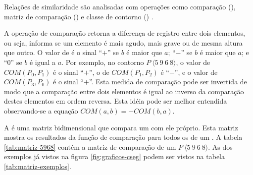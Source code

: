 Relações de similaridade \cite{marvin.ea87:relating} são analisadas
com operações como comparação (), matriz de comparação
() e classe de contorno () .

A operação de comparação  retorna a diferença de registro
entre dois elementos, ou seja, informa se um elemento é mais agudo,
mais grave ou de mesma altura que outro. O valor de  é o sinal
``$+$'' se $b$ é maior que $a$; ``$-$'' se $b$ é maior que $a$; e
``$0$'' se $b$ é igual a $a$. Por exemplo, no contorno
$P\:\langle5\:9\:6\:8\rangle$, o valor de $COM(P_0,P_1)$ é o sinal
``$+$'', o de $COM(P_1,P_2)$ é ``$-$'', e o valor de $COM(P_3,P_0)$ é
o sinal ``$+$''. Esta medida de comparação pode ser invertida de modo
que a comparação entre dois elementos é igual ao inverso da comparação
destes elementos em ordem reversa. Esta idéia pode ser melhor
entendida observando-se a equação $COM(a,b)=-COM(b,a)$.

A  é uma matriz bidimensional que compara um 
com ele próprio. Esta matriz mostra os resultados da função de
comparação  para todos os  de um . A
tabela \ref{tab:matriz-5968} contém a matriz de comparação de um
 $P\:\langle5\:9\:6\:8\rangle$. As  dos
exemplos já vistos na figura \ref{fig:graficos-cseg} podem ser vistos
na tabela \ref{tab:matriz-exemplos}.

